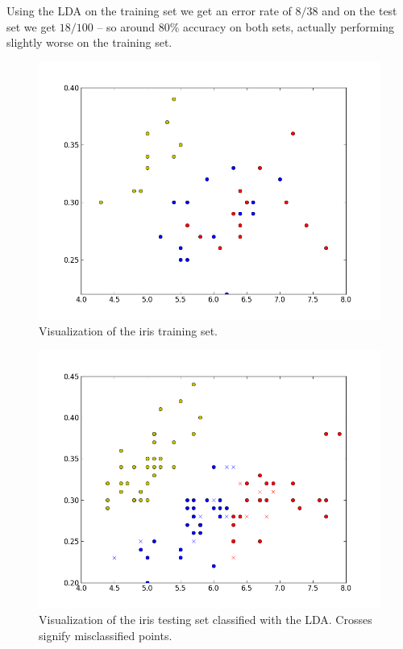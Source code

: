 \documentclass[11pt,a4paper]{article}
\begin{document}
Using the LDA on the training set we get an error rate of $8/38$ and on the
test set we get $18/100$ -- so around $80\%$ accuracy on both sets, actually
performing slightly worse on the training set.

\begin{figure}[htbp]
    \centering
    \includegraphics[width=\textwidth]{images/prob21-iristrain.png}
    \caption{Visualization of the iris training set.}
    \label{fig:iris_train}
\end{figure}

\begin{figure}[htbp]
    \centering
    \includegraphics[width=\textwidth]{images/prob21-lda.png}
    \caption{Visualization of the iris testing set classified with the LDA.
             Crosses signify misclassified points.}
    \label{fig:iris_lda}
\end{figure}
\end{document}
